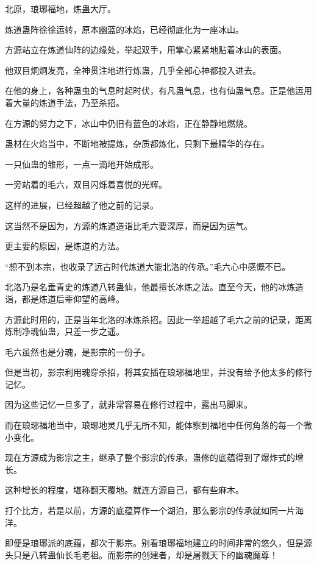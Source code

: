 
\begin{this_body}



北原，琅琊福地，炼蛊大厅。

炼道蛊阵徐徐运转，原本幽蓝的冰焰，已经彻底化为一座冰山。

方源站立在炼道仙阵的边缘处，举起双手，用掌心紧紧地贴着冰山的表面。

他双目炯炯发亮，全神贯注地进行炼蛊，几乎全部心神都投入进去。

在他的身上，各种蛊虫的气息时起时伏，有凡蛊气息，也有仙蛊气息。正是他运用着大量的炼道手法，乃至杀招。

在方源的努力之下，冰山中仍旧有蓝色的冰焰，正在静静地燃烧。

蛊材在火焰当中，不断地被提炼，杂质都炼化，只剩下最精华的存在。

一只仙蛊的雏形，一点一滴地开始成形。

一旁站着的毛六，双目闪烁着喜悦的光辉。

这样的进展，已经超越了他之前的记录。

这当然不是因为，方源的炼道造诣比毛六要深厚，而是因为运气。

更主要的原因，是炼道的方法。

“想不到本宗，也收录了远古时代炼道大能北洛的传承。”毛六心中感慨不已。

北洛乃是名垂青史的炼道八转蛊仙，他最擅长冰炼之法。直至今天，他的冰炼造诣，都是炼道后辈仰望的高峰。

方源此时用的，正是当年北洛的冰炼杀招。因此一举超越了毛六之前的记录，距离炼制净魂仙蛊，只差一步之遥。

毛六虽然也是分魂，是影宗的一份子。

但是当初，影宗利用魂穿杀招，将其安插在琅琊福地里，并没有给予他太多的修行记忆。

因为这些记忆一旦多了，就非常容易在修行过程中，露出马脚来。

而在琅琊福地当中，琅琊地灵几乎无所不知，能体察到福地中任何角落的每一个微小变化。

现在方源成为影宗之主，继承了整个影宗的传承，蛊修的底蕴得到了爆炸式的增长。

这种增长的程度，堪称翻天覆地。就连方源自己，都有些麻木。

打个比方，若是以前，方源的底蕴算作一个湖泊，那么影宗的传承就如同一片海洋。

即便是琅琊派的底蕴，都次于影宗。别看琅琊福地建立的时间非常的悠久，但是源头只是八转蛊仙长毛老祖。而影宗的创建者，却是屠戮天下的幽魂魔尊！


\end{this_body}
